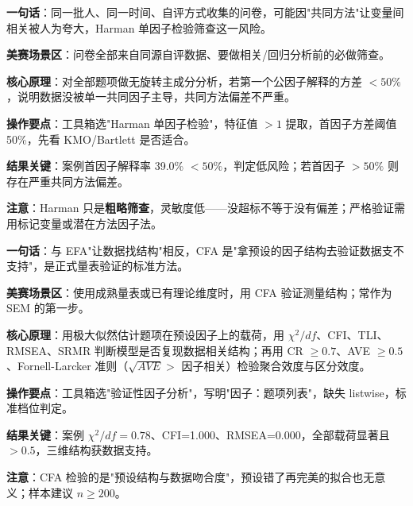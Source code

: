 
\begin{algobrief}
\textbf{一句话}：同一批人、同一时间、自评方式收集的问卷，可能因"共同方法"让变量间相关被人为夸大，Harman 单因子检验筛查这一风险。

\textbf{美赛场景区}：问卷全部来自同源自评数据、要做相关/回归分析前的必做筛查。

\textbf{核心原理}：对全部题项做无旋转主成分分析，若第一个公因子解释的方差 $<50\%$，说明数据没被单一共同因子主导，共同方法偏差不严重。

\textbf{操作要点}：工具箱选"Harman 单因子检验"，特征值 $>1$ 提取，首因子方差阈值 50\%，先看 KMO/Bartlett 是否适合。

\textbf{结果关键}：案例首因子解释率 39.0\% $<50\%$，判定低风险；若首因子 $>50\%$ 则存在严重共同方法偏差。

\textbf{注意}：Harman 只是\textbf{粗略筛查}，灵敏度低——没超标不等于没有偏差；严格验证需用标记变量或潜在方法因子法。
\end{algobrief}


\begin{algobrief}
\textbf{一句话}：与 EFA"让数据找结构"相反，CFA 是"拿预设的因子结构去验证数据支不支持"，是正式量表验证的标准方法。

\textbf{美赛场景区}：使用成熟量表或已有理论维度时，用 CFA 验证测量结构；常作为 SEM 的第一步。

\textbf{核心原理}：用极大似然估计题项在预设因子上的载荷，用 $\chi^2/df$、CFI、TLI、RMSEA、SRMR 判断模型是否复现数据相关结构；再用 CR $\geq 0.7$、AVE $\geq 0.5$、Fornell-Larcker 准则（$\sqrt{AVE}>$ 因子相关）检验聚合效度与区分效度。

\textbf{操作要点}：工具箱选"验证性因子分析"，写明"因子：题项列表"，缺失 listwise，标准档位判定。

\textbf{结果关键}：案例 $\chi^2/df=0.78$、CFI=1.000、RMSEA=0.000，全部载荷显著且 $>0.5$，三维结构获数据支持。

\textbf{注意}：CFA 检验的是"预设结构与数据吻合度"，预设错了再完美的拟合也无意义；样本建议 $n \geq 200$。
\end{algobrief}


